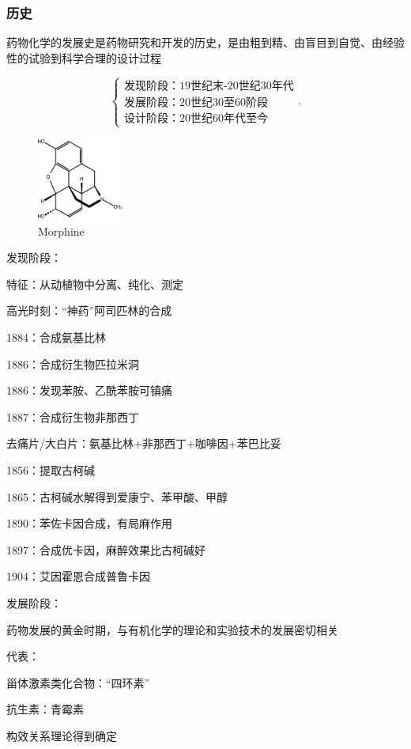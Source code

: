 \subsubsection{历史}%
\label{subsub:历史}
\begin{notation}
    药物化学的发展史是药物研究和开发的历史，是由粗到精、由盲目到自觉、由经验性的试验到科学合理的设计过程
\end{notation}
\[
    \begin{cases}
        \text{发现阶段：19世纪末-20世纪30年代}\\
        \text{发展阶段：20世纪30至60阶段}\\
        \text{设计阶段：20世纪60年代至今}
    \end{cases}
.\] 
\begin{figure}[htpb]
    \centering
    \includegraphics[width=0.25\textwidth]{fig/Morphine}
    \caption{Morphine}
    \label{fig:fig-Morphine}
\end{figure}
\begin{notation}
    发现阶段：

    特征：从动植物中分离、纯化、测定

    高光时刻：“神药”阿司匹林的合成

    1884：合成氨基比林

    1886：合成衍生物匹拉米洞

    1886：发现苯胺、乙酰苯胺可镇痛

    1887：合成衍生物非那西丁

    去痛片/大白片：氨基比林+非那西丁+咖啡因+苯巴比妥

    1856：提取古柯碱

    1865：古柯碱水解得到爱康宁、苯甲酸、甲醇

    1890：苯佐卡因合成，有局麻作用

    1897：合成优卡因，麻醉效果比古柯碱好

    1904：艾因霍恩合成普鲁卡因
\end{notation}
\begin{notation}
    发展阶段：

    药物发展的黄金时期，与有机化学的理论和实验技术的发展密切相关

    代表：
    
    甾体激素类化合物：“四环素”

    抗生素：青霉素

    构效关系理论得到确定
\end{notation}

